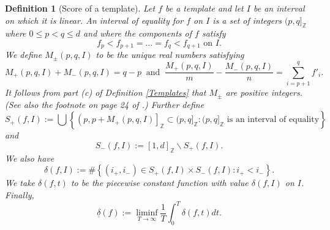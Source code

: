 \documentclass[reqno,11pt]{amsart}
\theoremstyle{plain}
\newtheorem{rem}[thm]{Remark}
\newtheorem{defn}[thm]{Definition}
\theoremstyle{definition}
\theoremstyle{remark}
\numberwithin{equation}{section}
\newcommand{\Z}{{\mathbb{Z}}}
\newcommand{\ignore}[1]{{}}
\newcommand{\bR}{\mathbb{R}}
\newcommand\seta[1]{\left\{#1\right\}}
\begin{document}
\ignore{\begin{rem}
    Given a lattice $x$, we say that a $j$-dimensional subspace $V<\bR^d$ is $x$-rational if it is spanned by vectors from $x$. To an $x$-rational $j$-dimensional subspace $V$ there corresponds  a well defined vector $s_V\in \wedge^j\bR^d$. We call $V$ a shortest subspace
    if $s_V = \min\seta{||s_W||:W \text{ is $x$-rational $j$-dimensional}}$. It is convenient
    to use the $\sup$-norm on $\wedge^j\bR^d$ with respect to the standard basis since then the slopes of the function
    $||a_t s_V||$ are taken from the set $Z(j)$ from \eqref{eq: Z(j)}. 
     The standard way to get a template is to start from a lattice $x$ and to define the 
    $f_j$'s recursively by setting for $1\le j\le d$, $\sum_1^j f_j(x) :=  \|s_V\|$ where $V$ is a shortest $j$-dimensional $x$-rational. 
\end{rem}}
\begin{defn}[Score of a template]\label{score}
Let $f$ be a template and let $I$ be an interval on which it is linear. An \textit{interval of equality} for $f$ on $I$ is a set of integers $(p,q]_\Z$ where $0\leq p < q \leq d$ and where the components of $f$ satisfy
\begin{equation*}
    f_{p}< f_{p+1} = \dots = f_{q} < f_{q+1} \text{ on } I.
\end{equation*}
We define $M_{\pm}(p,q,I)$ to be the unique real numbers satisfying
\begin{equation}
    M_+(p,q,I) + M_-(p,q,I) = q-p\ \text{ and }\ \frac{M_+(p,q,I)}{m} - \frac{M_-(p,q,I)}{n} = \sum_{i=p+1}^q f'_i.
\end{equation}
It follows from part (c) of Definition \ref{Templates} that $M_\pm$ are positive integers. (See also the footnote on page 24 of \cite{DFSU}.)
Further define 
\begin{equation}
    S_+(f,I) := \bigcup \left\lbrace \left(p, p+M_+(p,q,I)\right]_\Z \subset (p,q]_\Z : (p,q]_\Z \text{ is an interval of equality}  \right\rbrace
\end{equation}
and
\begin{equation}
    S_-(f,I):= [1,d]_\Z \smallsetminus S_+(f,I).
\end{equation}
We also have 
\begin{equation}
    \delta(f,I):= \#\left\lbrace (i_+, i_-) \in S_+(f,I)\times S_-(f,I): i_+< i_- \right\rbrace.
\end{equation}
We take $\delta(f,t)$ to be the piecewise constant function with value $\delta(f,I)$ on $I$.
Finally,
\begin{equation}
    \underline{\delta}(f) := \liminf_{T \to \infty} \frac{1}{T} \int_0^T \delta(f,t)dt.
\end{equation}
\end{defn}
\end{document}
